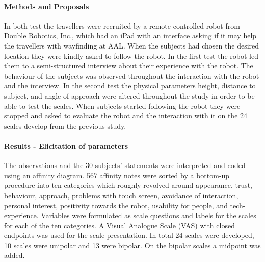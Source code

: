 \documentclass[a4paper]{article}
\begin{document}
\paragraph{Methods and Proposals}
%
In both test the travellers were recruited by a remote controlled robot from Double Robotics, Inc., which had an iPad with an interface asking if it may help the travellers with wayfinding at AAL. When the subjects had chosen the desired location they were kindly asked to follow the robot. In the first test the robot led them to a semi-structured interview about their experience with the robot. The behaviour of the subjects was observed throughout the interaction with the robot and the interview. In the second test the physical parameters height, distance to subject, and angle of approach were altered throughout the study in order to be able to test the scales. When subjects started following the robot they were stopped and asked to evaluate the robot and the interaction with it on the 24 scales develop from the previous study. 

\paragraph{Results - Elicitation of parameters}
The observations and the 30 subjects' statements were interpreted and coded using an affinity diagram. 567 affinity notes were sorted by a bottom-up procedure into ten categories which roughly revolved around appearance, trust, behaviour, approach, problems with touch screen, avoidance of interaction, personal interest, positivity towards the robot, usability for people, and tech-experience. Variables were formulated as scale questions and labels for the scales for each of the ten categories. A Visual Analogue Scale (VAS) with closed endpoints was used for the scale presentation. In total 24 scales were developed, 
10 scales were unipolar and 13 were bipolar. On the bipolar scales a midpoint was added.  
\end{document}
